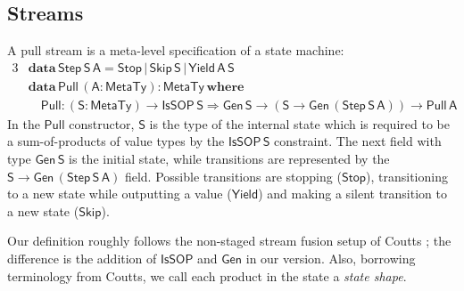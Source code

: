\documentclass[acmsmall,screen]{acmart}
\newcommand{\msf}[1]{{\mathsf{#1}}}
\newcommand{\mbf}[1]{{\mathbf{#1}}}
\newcommand{\ind}{\hspace{1em}}
\newcommand{\data}{\mbf{data}\,}
\newcommand{\where}{\mbf{where}}
\newcommand{\vA}{\mathsf{A}}
\newcommand{\vS}{\mathsf{S}}
\newcommand{\IsSOP}{\msf{IsSOP}}
\newcommand{\MTy}{\msf{MetaTy}}
\theoremstyle{remark}
\newcommand{\Gen}{\msf{Gen}}
\newcommand{\RA}{\Rightarrow}
\newcommand{\Stop}{\msf{Stop}}
\newcommand{\Skip}{\msf{Skip}}
\newcommand{\Yield}{\msf{Yield}}
\newcommand{\Step}{\msf{Step}}
\newcommand{\Pull}{\msf{Pull}}
\begin{document}
\subsection{Streams}

A pull stream is a meta-level specification of a state machine:
\begin{alignat*}{3}
  & \data \Step\,\vS\,\vA = \Stop\,|\,\Skip\,\vS\,|\,\Yield\,\vA\,\vS\\
  & \data \Pull\,(\vA : \MTy) : \MTy\,\where\\
  & \ind \Pull : (\vS : \MTy) \to \IsSOP\,\vS \RA \Gen\,\vS \to (\vS \to \Gen\,(\Step\,\vS\,\vA)) \to \Pull\,\vA
\end{alignat*}
In the $\Pull$ constructor, $\vS$ is the type of the internal state which is
required to be a sum-of-products of value types by the $\IsSOP\,\vS$
constraint. The next field with type $\Gen\,\vS$ is the initial state, while
transitions are represented by the $\vS \to \Gen\,(\Step\,\vS\,\vA)$
field. Possible transitions are stopping ($\Stop$), transitioning to a new state
while outputting a value ($\Yield$) and making a silent transition to a new
state ($\Skip$).

Our definition roughly follows the non-staged stream fusion setup of
Coutts \cite{DBLP:phd/ethos/Coutts11}; the difference is the addition of
$\IsSOP$ and $\Gen$ in our version. Also, borrowing terminology from Coutts, we
call each product in the state a \emph{state shape}.
\end{document}
